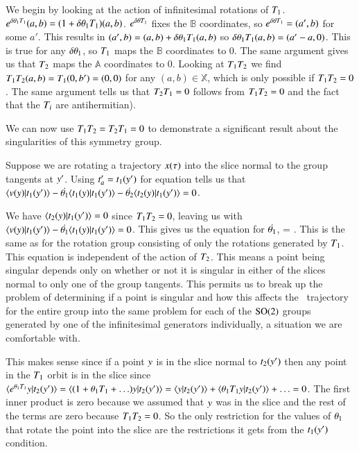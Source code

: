 We begin by looking at the action of infinitesimal rotations of $T_1$.
$e^{\delta {\bf \theta}_1 T_1}(a,b)=(1+\delta {\bf \theta}_1 T_1)
(a,b)$. $e^{\delta {\bf \theta} T_1}$ fixes the
$\mathbb{B}$ coordinates, so $e^{\delta {\bf \theta} T_1}=(a',b)$ for some
$a'$. This results in $(a',b)=(a,b)+\delta {\bf \theta}_1 T_1(a,b)$ so
$\delta {\bf \theta}_1 T_1(a,b)=(a'-a,0)$. This is true for any $\delta
{\bf \theta}_1$, so $T_1$ maps the $\mathbb{B}$ coordinates to 0. The same
argument gives us that $T_2$ maps the $\mathbb{A}$ coordinates to 0.
Looking at $T_1 T_2$ we find $T_1 T_2 (a,b)=T_1 (0,b')=(0,0)$
for any $(a,b) \in \mathbb{X}$, which is only possible if $T_1
T_2=0$. The same argument tells us that $T_2 T_1=0$ %
follows from $T_1 T_2=0$ and the fact that the $T_i$ are
antihermitian).

We can now use $T_1 T_2=T_2 T_1=0$ to demonstrate a significant
result about the singularities of this symmetry group.

Suppose we are rotating a trajectory $x(\tau)$ into the slice normal
to the group tangents at ${y'}$. Using
$t'_{a}=t_1({y'})$ for equation
 tells us that
$\braket{\vel(\sspRed)}{\groupTan_1(\slicep)}-\dot{\gSpace_1} \braket{
\groupTan_1(\sspRed)}{\groupTan_1(\slicep)}-\dot{\gSpace_2} \braket{
\groupTan_2(\sspRed)}{\groupTan_1(\slicep)}=0$.

We have $\braket{\groupTan_2(\sspRed)}{\groupTan_1(\slicep)}=0$ since
$T_1 T_2=0$, leaving us with
$\braket{\vel(\sspRed)}{\groupTan_1(\slicep)}
-\dot{\gSpace_1}\braket{\groupTan_1(\sspRed)}{\groupTan_1(\slicep)}=0$.
This gives us the equation for $\dot{{\bf \theta}_1}$,
\beq
{}=
                     {}.
\eeq
This is the same as  for the rotation group
consisting of only the rotations generated by $T_1$. This equation is
independent of the action of $T_2$. This means a point being singular
depends only on whether or not it is singular in either of the slices
normal to only one of the group tangents. This permits us to break up the
problem of determining if a point is singular and how this affects the
\reducedsp\ trajectory for the entire group into the same problem for
each of the $\textrm{SO}(2)$ groups generated by one of the infinitesimal
generators individually, a situation we are comfortable with.

This makes sense since if a point $y$ is in the slice normal to
$t_2({y'})$ then any point in the $T_1$ orbit is in the
slice since $\braket{e^{\gSpace_1
\Lg_1}\sspRed}{\groupTan_2(\slicep)}=\braket{(1+\gSpace_1
\Lg_1+\ldots)\sspRed}{\groupTan_2(\slicep)}
=\braket{\sspRed}{\groupTan_2(\slicep)}+\braket{\gSpace_1
\Lg_1 \sspRed}{\groupTan_2(\slicep)}+\ldots=0$. The first inner product
is zero because we assumed that $y$ was in the slice and the rest
of the terms are zero because $T_1 T_2=0$. So the only restriction
for the values of ${\bf \theta}_1$ that rotate the point into the slice are
the restrictions it gets from the $t_1({y'})$ condition.

